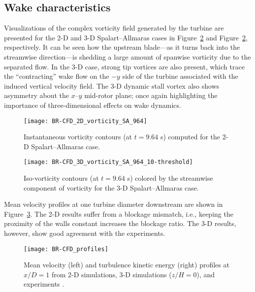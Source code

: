 \subsection{Wake characteristics}

Visualizations of the complex vorticity field generated by the turbine are
presented for the 2-D and 3-D Spalart--Allmaras cases in
Figure~\ref{fig:br-vorticity-3d} and Figure~\ref{fig:br-vorticity-3d},
respectively. It can be seen how the upstream blade---as it turns back into the
streamwise direction---is shedding a large amount of spanwise vorticity due to
the separated flow. In the 3-D case, strong tip vortices are also present, which
trace the ``contracting'' wake flow on the $-y$ side of the turbine associated
with the induced vertical velocity field. The 3-D dynamic stall vortex also
shows asymmetry about the $x$--$y$ mid-rotor plane; once again highlighting the
importance of three-dimensional effects on wake dynamics.

\begin{figure}
    \centering

    \texttt{[image: BR-CFD\_2D\_vorticity\_SA\_964]}

    \caption{Instantaneous vorticity contours (at $t=9.64$ s) computed for the
        2-D Spalart--Allmaras case.}

    \label{fig:br-vorticity-2d}
\end{figure}

\begin{figure}
    \centering

    \texttt{[image: BR-CFD\_3D\_vorticity\_SA\_964\_10-threshold]}

    \caption{Iso-vorticity contours (at $t=9.64$ s) colored by the streamwise
        component of vorticity for the 3-D Spalart--Allmaras case.}

    \label{fig:br-vorticity-3d}
\end{figure}

Mean velocity profiles at one turbine diameter downstream are shown in
Figure~\ref{fig:br-cfd-profiles}. The 2-D results suffer from a blockage
mismatch, i.e., keeping the proximity of the walls constant increases the
blockage ratio. The 3-D results, however, show good agreement with the
experiments.

\begin{figure}
    \centering

    \texttt{[image: BR-CFD\_profiles]}

    \caption{Mean velocity (left) and turbulence kinetic energy (right) profiles
        at $x/D=1$ from 2-D simulations, 3-D simulations ($z/H=0$), and experiments
        \cite{Bachant2015-JoT}.}

    \label{fig:br-cfd-profiles}
\end{figure}

